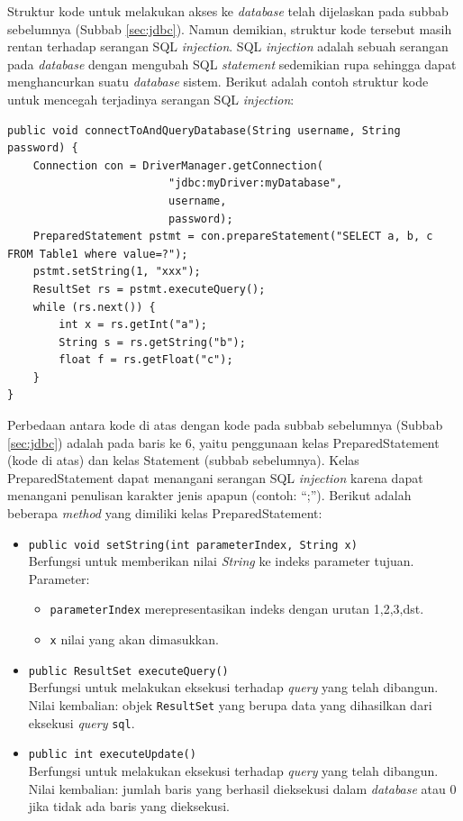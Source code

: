 Struktur kode untuk melakukan akses ke \textit{database} telah dijelaskan pada subbab sebelumnya (Subbab \ref{sec:jdbc}). Namun demikian, struktur kode tersebut masih rentan terhadap serangan SQL \textit{injection}. SQL \textit{injection} adalah sebuah serangan pada \textit{database} dengan mengubah SQL \textit{statement} sedemikian rupa sehingga dapat menghancurkan suatu \textit{database} sistem\cite{w3schools}. Berikut adalah contoh struktur kode untuk mencegah terjadinya serangan SQL \textit{injection}:

\begin{lstlisting}
public void connectToAndQueryDatabase(String username, String password) {
    Connection con = DriverManager.getConnection(
                         "jdbc:myDriver:myDatabase",
                         username,
                         password);
    PreparedStatement pstmt = con.prepareStatement("SELECT a, b, c FROM Table1 where value=?");
    pstmt.setString(1, "xxx");
    ResultSet rs = pstmt.executeQuery();
    while (rs.next()) {
        int x = rs.getInt("a");
        String s = rs.getString("b");
        float f = rs.getFloat("c");
    }
}
\end{lstlisting}

Perbedaan antara kode di atas dengan kode pada subbab sebelumnya (Subbab \ref{sec:jdbc}) adalah pada baris ke 6, yaitu penggunaan kelas PreparedStatement (kode di atas) dan kelas Statement (subbab sebelumnya). Kelas PreparedStatement dapat menangani serangan SQL \textit{injection} karena dapat menangani penulisan karakter jenis apapun (contoh: ``;''). Berikut adalah beberapa \textit{method} yang dimiliki kelas PreparedStatement:
\begin{itemize}
	\item \texttt{public void setString(int parameterIndex, String x)}\\
		Berfungsi untuk memberikan nilai \textit{String} ke indeks parameter tujuan.\\
		Parameter:
		\begin{itemize}
			\item \texttt{parameterIndex} merepresentasikan indeks dengan urutan 1,2,3,dst.
			\item \texttt{x} nilai yang akan dimasukkan.
		\end{itemize}
	\item \texttt{public ResultSet executeQuery()}\\
		Berfungsi untuk melakukan eksekusi terhadap \textit{query} yang telah dibangun.\\
		Nilai kembalian: objek \texttt{ResultSet} yang berupa data yang dihasilkan dari eksekusi \textit{query} \texttt{sql}.
	\item \texttt{public int executeUpdate()}\\
		Berfungsi untuk melakukan eksekusi terhadap \textit{query} yang telah dibangun.\\
		Nilai kembalian: jumlah baris yang berhasil dieksekusi dalam \textit{database} atau 0 jika tidak ada baris yang dieksekusi.
\end{itemize}

